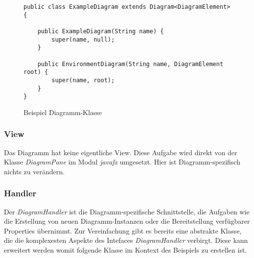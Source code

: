 \begin{figure}[h!]
	\centering
	\begin{lstlisting}
public class ExampleDiagram extends Diagram<DiagramElement> {

    public ExampleDiagram(String name) {
        super(name, null);
    }

    public EnvironmentDiagram(String name, DiagramElement root) {
        super(name, root);
    }
}
	\end{lstlisting}
	\caption{Beispiel Diagramm-Klasse}
\end{figure}

\subsubsection{View}
Das Diagramm hat keine eigentliche View. Diese Aufgabe wird direkt von der Klasse \textit{DiagramPane} im Modul 
\textit{javafx} umgesetzt. Hier ist Diagramm-spezifisch nichts zu verändern.

\subsubsection{Handler}
Der \textit{DiagramHandler} ist die Diagramm-spezifische Schnittstelle, die Aufgaben wie die Erstellung von neuen
Diagramm-Instanzen oder die Bereitstellung verfügbarer Properties übernimmt. Zur Vereinfachung gibt es bereits eine
abstrakte Klasse, die die komplexesten Aspekte des Intefaces \textit{DiagramHandler} verbirgt. Diese kann erweitert
werden womit folgende Klasse im Kontext des Beispiels zu erstellen ist.

